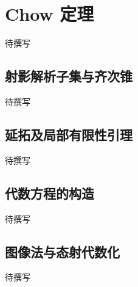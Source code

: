 
% 
% 

\section{Chow 定理}
\label{g4:sec:2002}

待撰写

\subsection{射影解析子集与齐次锥}
\label{g4:subsec:2002:01}
待撰写

\subsection{延拓及局部有限性引理}
\label{g4:subsec:2002:02}
待撰写

\subsection{代数方程的构造}
\label{g4:subsec:2002:03}
待撰写

\subsection{图像法与态射代数化}
\label{g4:subsec:2002:04}
待撰写
